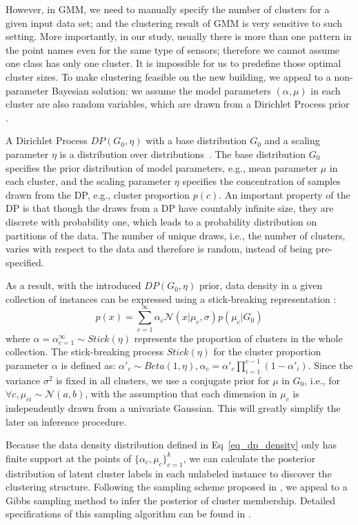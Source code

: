 However, in GMM, we need to manually specify the number of clusters for a given input data set; and the clustering result of GMM is very sensitive to such setting. More importantly, in our study, usually there is more than one pattern in the point names even for the same type of sensors; therefore we cannot assume one class has only one cluster. It is impossible for us to predefine those optimal cluster sizes. To make clustering feasible on the new building, we appeal to a non-parameter Bayesian solution: we assume the model parameters $(\alpha, \mu)$ in each cluster are also random variables, which are drawn from a Dirichlet Process prior \cite{dp}.

A Dirichlet Process $DP(G_0, \eta)$ with a base distribution $G_0$ and a scaling parameter $\eta$ is a distribution over distributions~\cite{dp}. The base distribution $G_0$ specifies the prior distribution of model parameters, e.g., mean parameter $\mu$ in each cluster, and the scaling parameter $\eta$ specifies the concentration of samples drawn from the DP, e.g., cluster proportion $p(c)$. An important property of the DP is that though the draws from a DP have countably infinite size, they are discrete with probability one, which leads to a probability distribution on partitions of the data. The number of unique draws, i.e., the number of clusters, varies with respect to the data and therefore is random, instead of being pre-specified.

As a result, with the introduced $DP(G_{0}, \eta)$ prior, data density in a given collection of instances can be expressed using a stick-breaking representation
\cite{sethuraman1994constructive}:
\begin{equation}\label{eq_dp_density}
p(x)=\sum_{c=1}^\infty \alpha_c \mathcal{N}(x|\mu_c,\sigma)p(\mu_c|G_0)
\end{equation}
where $\alpha={\alpha}_{c=1}^\infty\sim Stick(\eta)$ represents the proportion of clusters in the whole collection. The stick-breaking process $Stick(\eta)$ for the cluster proportion parameter $\alpha$ is defined as: $\alpha'_c\sim Beta(1, \eta), \alpha_c=\alpha'_c\prod_{i=1}^{c-1}(1-\alpha'_i)$. Since the variance $\sigma^2$ is fixed in all clusters, we use a conjugate prior for $\mu$ in $G_0$, i.e., for $\forall c, \mu_{ci}\sim \mathcal{N}(a,b)$, with the assumption that each dimension in $\mu_c$ is independently drawn from a univariate Gaussian. This will greatly simplify the later on inference procedure.

Because the data density distribution defined in Eq~\eqref{eq_dp_density} only has finite support at the points of $\{\alpha_c, \mu_c\}^k_{c=1}$, we can calculate the posterior distribution of latent cluster labels in each unlabeled instance to discover the clustering structure. Following the sampling scheme proposed in \cite{neal2000markov}, we appeal to a Gibbs sampling method to infer the posterior of cluster membership. Detailed specifications of this sampling algorithm can be found in \cite{neal2000markov}.

